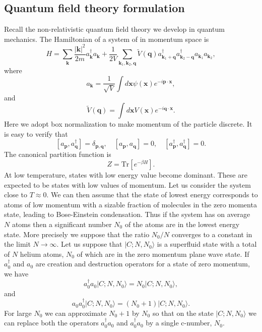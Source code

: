 \subsection{Quantum field theory formulation}
Recall the non-relativistic quantum field theory we develop in quantum mechanics.
The Hamiltonian of a system of  in momentum space is
\[H = \sum_{\bm{k}} \frac{|\bm{k}|^2}{2m} a_{\bm{k}}^{\dagger} a_{\bm{k}} + \frac{1}{2V} \sum_{\bm{k}_1,\bm{k}_2,\bm{q}} \tilde{V}(\bm{q}) a^{\dagger}_{\bm{k}_1 + \bm{q}} a^{\dagger}_{\bm{k}_2-\bm{q}} a_{\bm{k}_1} a_{\bm{k}_2},\]
where
\[a_{\bm{k}} = \frac{1}{\sqrt{V}} \int d\bm{x}\psi(\bm{x}) e^{-i\bm{p}\cdot\bm{x}},\]
and
\[\tilde{V}(\bm{q}) = \int d\bm{x} V(\bm{x}) e^{-i\bm{q}\cdot\bm{x}}.\]
Here we adopt box normalization to make momentum of the particle discrete. It is easy to verify that
\[[a_{\bm{p}},a_{\bm{q}}^{\dagger}] = \delta_{\bm{p},\bm{q}} , \quad [a_{\bm{p}},a_{\bm{q}}] = 0 , \quad [a^{\dagger}_{\bm{p}},a^{\dagger}_{\bm{q}}] = 0.\]
The canonical partition function is
\[Z = \mathrm{Tr}[e^{-\beta H}].\]
At low temperature, states with low energy value become dominant. These are expected to be states with low values of momentum. 
Let us consider the system close to $T \approx 0$. 
We can then assume that the state of lowest energy corresponds to atoms of low momentum with a sizable fraction of molecules in the zero momenta state, leading to Bose-Einstein condensation. 
Thus if the system has on average $N$ atoms then a significant number $N_0$ of the atoms are in the lowest energy state. More precisely we suppose that the ratio $N_0 / N$ converges to a constant in the limit $N \to \infty$. 
Let us suppose that $|C;N,N_0\rangle$ is a superfluid state with a total of $N$ helium atoms, $N_0$ of which are in the zero momentum plane wave state. 
If $a_0^{\dagger}$ and $a_0$ are creation and destruction operators for a state of zero momentum, we have
\[a_0^{\dagger}a_0 |C;N,N_0\rangle = N_0 |C;N,N_0\rangle,\]
and
\[a_0a_0^{\dagger} |C;N,N_0\rangle = (N_0+1) |C;N,N_0\rangle.\]
For large $N_0$ we can approximate $N_0 + 1$ by $N_0$ so that on the state $|C;N,N_0\rangle$ we can replace both the operators $a_0^{\dagger}a_0$ and $a_0^{\dagger}a_0$ by a single c-number, $N_0$.

